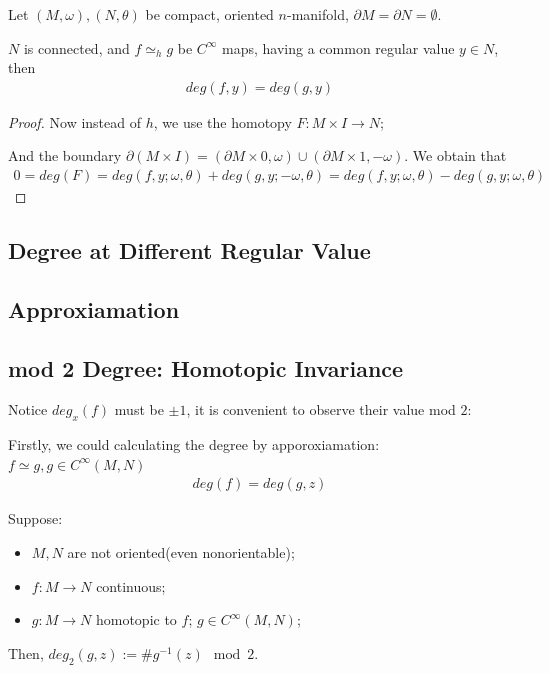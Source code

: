 \documentclass[Total.tex]{subfiles}
\begin{document}
				\begin{corollary}
					Let $(M,\omega),(N,\theta)$ be compact, oriented $n$-manifold, $\partial M=\partial N=\emptyset$. 
					
					$N$ is connected, and $f\simeq_{h} g$ be $C^\infty$ maps, having a common regular value $y\in N$, then
					\begin{gather*}
						deg(f,y)=deg(g,y)
					\end{gather*}
				\end{corollary}
				\begin{proof}
					Now instead of $h$, we use the homotopy $F:M\times I\rightarrow N$;
					
					And the boundary $\partial(M\times I)=(\partial M\times 0,\omega)\cup (\partial M\times 1,-\omega)$. We obtain that
					\begin{gather*}
						0=deg(F)=deg(f,y;\omega,\theta)+deg(g,y;-\omega,\theta)=deg(f,y;\omega,\theta)-deg(g,y;\omega,\theta)
					\end{gather*}
				\end{proof}	
				
			\subsection{Degree at Different Regular Value}
			
			\subsection{Approxiamation}
			
			\subsection{mod 2 Degree: Homotopic Invariance}
				Notice $deg_x(f)$ must be $\pm 1$, it is convenient to observe their value mod $2$: 
				
				Firstly, we could calculating the degree by apporoxiamation: $f\simeq g,g\in C^\infty(M,N)$
				\begin{gather*}
					deg(f)=deg(g,z)
				\end{gather*}
			
				\begin{Def}
					Suppose:
					\begin{itemize}
						\item $M,N$ are not oriented(even nonorientable); 
						\item $f:M\rightarrow N$ continuous;
						\item $g:M\rightarrow N$ homotopic to $f$; $g\in C^\infty(M,N)$;
					\end{itemize}
					
					Then, $deg_2(g,z):=\#g^{-1}(z)\mod 2$. 
				\end{Def}
				
\end{document}
